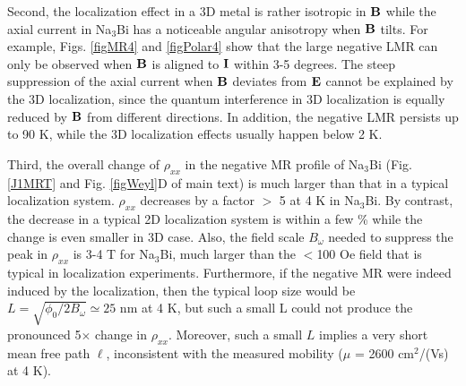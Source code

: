 Second, the localization effect in a 3D metal is rather isotropic in $\bf B$ while the axial current in Na$_3$Bi has a noticeable angular anisotropy when $\bf B$ tilts. For example, Figs. \ref{figMR4} and \ref{figPolar4} show that the large negative LMR can only be observed when $\bf B$ is aligned to $\bf I$ within 3-5 degrees. The steep suppression of the axial current when $\bf B$ deviates from $\bf E$ cannot be explained by the 3D localization, since the quantum interference in 3D localization is equally reduced by $\bf B$ from different directions. In addition, the negative LMR persists up to 90 K, while the 3D localization effects usually happen below 2 K.

Third, the overall change of $\rho_{xx}$ in the negative MR profile of Na$_3$Bi (Fig. \ref{J1MRT} and Fig. \ref{figWeyl}D of main text) is much larger than that in a typical localization system. $\rho_{xx}$ decreases by a factor $>$ 5 at 4 K in Na$_3$Bi. By contrast, the decrease in a typical 2D localization system is within a few \% while the change is even smaller in 3D case. Also, the field scale $B_{\omega}$ needed to suppress the peak in $\rho_{xx}$ is 3-4 T for Na$_3$Bi, much larger than the $<$100 Oe field that is typical in localization experiments. Furthermore, if the negative MR were indeed induced by the localization, then the typical loop size would be $L = \sqrt{\phi_0/2B_{\omega}} \simeq 25$ nm at 4 K, but such a small L could not produce the pronounced 5$\times$ change in $\rho_{xx}$. Moreover, such a small $L$ implies a very short mean free path $\ell$, inconsistent with the measured mobility ($\mu$ = 2600 cm$^2$/(Vs) at 4 K).
